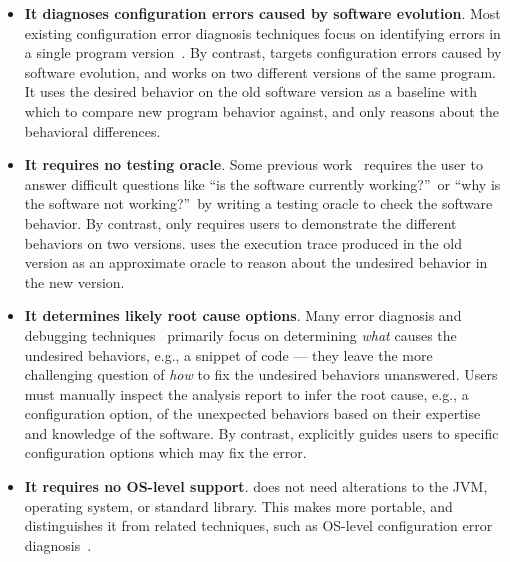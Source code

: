\begin{itemize}
\item \textbf{It diagnoses configuration errors caused by software evolution}.
Most existing configuration error diagnosis techniques
focus on identifying errors in a single program
version~\cite{Wang:2004:AMT, Rabkin:2011:PPC, Whitaker:2004:CDS,
Zhang:2013:ADS, Attariyan:2010:ACT, Su:2007:AIC, Attariyan:2008:UCD, xray}.
By contrast, \ourtool targets
configuration errors caused by software evolution, and
works on two different versions of the same program. 
It uses the desired behavior on the old software version
as a baseline with which to compare new program behavior against, and only
reasons about the behavioral differences.


\item \textbf{It requires no testing oracle}.
Some previous work~\cite{Rabkin:2011:PPC, Whitaker:2004:CDS,
Attariyan:2010:ACT, Su:2007:AIC} requires the user to answer difficult
questions like ``is the software currently working?''\ or ``why is the
software not working?''\ by writing a testing
oracle to check the software behavior. By contrast,
\ourtool only requires users to
demonstrate the different behaviors on two versions.
\ourtool uses the execution trace produced in the old
version as an approximate oracle to
reason about the undesired behavior in the new version.

\item \textbf{It determines likely root cause options}.
Many error diagnosis and debugging techniques~\cite{dd, autoflow}
primarily focus on
determining \textit{what} causes the undesired behaviors, e.g.,
a snippet of code --- they leave the more challenging
question of \textit{how} to fix the undesired behaviors
unanswered. Users must manually inspect the analysis
report to infer
the root cause, e.g., a configuration option,
of the unexpected behaviors 
based on their expertise and knowledge of the software.
By contrast, \ourtool explicitly guides users to specific
configuration options which may fix the error.


\item \textbf{It requires no OS-level support}. \ourtool
does not need alterations to the JVM, operating system, or
standard library. This makes \ourtool more portable, and
distinguishes it from related techniques, such as
OS-level configuration error diagnosis~\cite{Whitaker:2004:CDS, Su:2007:AIC}.

\end{itemize}

